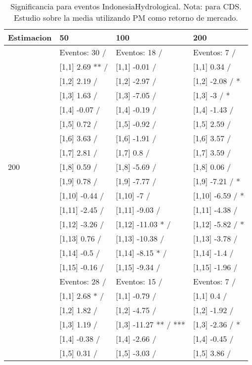 \begin{table}

\caption{Significancia para eventos IndonesiaHydrological. Nota: para CDS. Estudio sobre la media utilizando PM como retorno de mercado.}
\centering
\begin{tabular}[t]{llll}
\toprule
Estimacion & 50 & 100 & 200\\
\midrule
 & Eventos:  30 / & Eventos:  18 / & Eventos:  7 /\\
 & {}[1,1] 2.69 ** / & {}[1,1] -0.01  / & {}[1,1] 0.34  /\\
 & {}[1,2] 2.19  / & {}[1,2] -2.97  / & {}[1,2] -2.08  / *\\
 & {}[1,3] 1.63  / & {}[1,3] -7.05  / & {}[1,3] -3  / *\\
 & {}[1,4] -0.07  / & {}[1,4] -0.19  / & {}[1,4] -1.43  /\\
\addlinespace
 & {}[1,5] 0.72  / & {}[1,5] -0.92  / & {}[1,5] 2.59  /\\
 & {}[1,6] 3.63  / & {}[1,6] -1.91  / & {}[1,6] 3.57  /\\
 & {}[1,7] 2.81  / & {}[1,7] 0.8  / & {}[1,7] 3.59  /\\
200 & {}[1,8] 0.59  / & {}[1,8] -5.69  / & {}[1,8] 0.06  /\\
 & {}[1,9] 0.78  / & {}[1,9] -7.77  / & {}[1,9] -7.21  / *\\
\addlinespace
 & {}[1,10] -0.44  / & {}[1,10] -7  / & {}[1,10] -6.59  / *\\
 & {}[1,11] -2.45  / & {}[1,11] -9.03  / & {}[1,11] -4.38  /\\
 & {}[1,12] -3.26  / & {}[1,12] -11.03 * / & {}[1,12] -5.82  / *\\
 & {}[1,13] 0.76  / & {}[1,13] -10.38  / & {}[1,13] -3.78  /\\
 & {}[1,14] -0.5  / & {}[1,14] -8.15 * / & {}[1,14] -1.4  /\\
\addlinespace
 & {}[1,15] -0.16  / & {}[1,15] -9.34  / & {}[1,15] -1.96  /\\
 & Eventos:  28 / & Eventos:  15 / & Eventos:  7 /\\
 & {}[1,1] 2.68 * / & {}[1,1] -0.79  / & {}[1,1] 0.4  /\\
 & {}[1,2] 1.82  / & {}[1,2] -4.75  / & {}[1,2] -1.92  /\\
 & {}[1,3] 1.19  / & {}[1,3] -11.27 ** / *** & {}[1,3] -2.36  / *\\
\addlinespace
 & {}[1,4] -0.38  / & {}[1,4] -2.66  / & {}[1,4] -0.45  /\\
 & {}[1,5] 0.31  / & {}[1,5] -3.03  / & {}[1,5] 3.86  /\\

\end{tabular}
\end{table}
